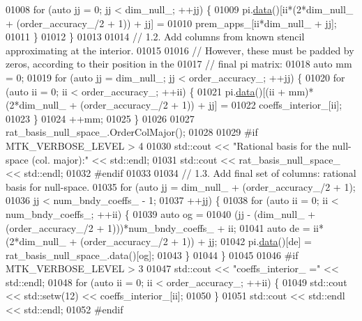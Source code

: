 \begin{DoxyCode}
{{01008     \textcolor{keywordflow}{for} (\textcolor{keyword}{auto} jj = 0; jj < dim\_null\_; ++jj) \{
01009       pi.\hyperlink{classmtk_1_1DenseMatrix_a0c33b8a9e01d157c61ddbdf807c25d84}{data}()[ii*(2*dim\_null\_ + (order\_accuracy\_/2 + 1)) + jj] =
01010         prem\_apps\_[ii*dim\_null\_ + jj];
01011     \}
01012   \}
01013 
01014   \textcolor{comment}{// 1.2. Add columns from known stencil approximating at the interior.}
01015 
01016   \textcolor{comment}{// However, these must be padded by zeros, according to their position in the}
01017   \textcolor{comment}{// final pi matrix:}
01018   \textcolor{keyword}{auto} mm = 0;
01019   \textcolor{keywordflow}{for} (\textcolor{keyword}{auto} jj = dim\_null\_; jj < order\_accuracy\_; ++jj) \{
01020     \textcolor{keywordflow}{for} (\textcolor{keyword}{auto} ii = 0; ii < order\_accuracy\_; ++ii) \{
01021       pi.\hyperlink{classmtk_1_1DenseMatrix_a0c33b8a9e01d157c61ddbdf807c25d84}{data}()[(ii + mm)*(2*dim\_null\_ + (order\_accuracy\_/2 + 1)) + jj] =
01022         coeffs\_interior\_[ii];
01023     \}
01024     ++mm;
01025   \}
01026 
01027   rat\_basis\_null\_space\_.OrderColMajor();
01028 
01029 \textcolor{preprocessor}{  #if MTK\_VERBOSE\_LEVEL > 4}
01030   std::cout << \textcolor{stringliteral}{"Rational basis for the null-space (col. major):"} << std::endl;
01031   std::cout << rat\_basis\_null\_space\_ << std::endl;
01032 \textcolor{preprocessor}{  #endif}
01033 
01034   \textcolor{comment}{// 1.3. Add final set of columns: rational basis for null-space.}
01035   \textcolor{keywordflow}{for} (\textcolor{keyword}{auto} jj = dim\_null\_ + (order\_accuracy\_/2 + 1);
01036        jj < num\_bndy\_coeffs\_ - 1;
01037        ++jj) \{
01038     \textcolor{keywordflow}{for} (\textcolor{keyword}{auto} ii = 0; ii < num\_bndy\_coeffs\_; ++ii) \{
01039       \textcolor{keyword}{auto} og =
01040         (jj - (dim\_null\_ + (order\_accuracy\_/2 + 1)))*num\_bndy\_coeffs\_ + ii;
01041       \textcolor{keyword}{auto} de = ii*(2*dim\_null\_ + (order\_accuracy\_/2 + 1)) + jj;
01042       pi.\hyperlink{classmtk_1_1DenseMatrix_a0c33b8a9e01d157c61ddbdf807c25d84}{data}()[de] = rat\_basis\_null\_space\_.data()[og];
01043     \}
01044   \}
01045 
01046 \textcolor{preprocessor}{  #if MTK\_VERBOSE\_LEVEL > 3}
01047   std::cout << \textcolor{stringliteral}{"coeffs\_interior\_ ="} << std::endl;
01048   \textcolor{keywordflow}{for} (\textcolor{keyword}{auto} ii = 0; ii < order\_accuracy\_; ++ii) \{
01049     std::cout << std::setw(12) << coeffs\_interior\_[ii];
01050   \}
01051   std::cout << std::endl << std::endl;
01052 \textcolor{preprocessor}{  #endif}
}}
\end{DoxyCode}
